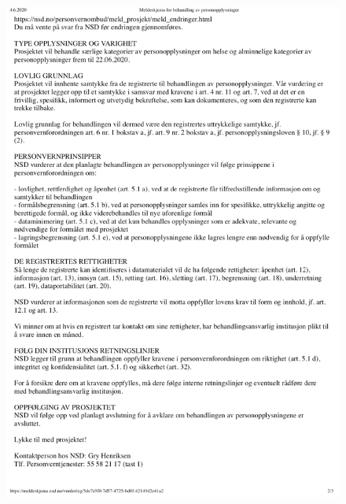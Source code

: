 \begin{figure}
    \centering
    \includegraphics[width=1\textwidth]{images/MS2.png}
\end{figure}

